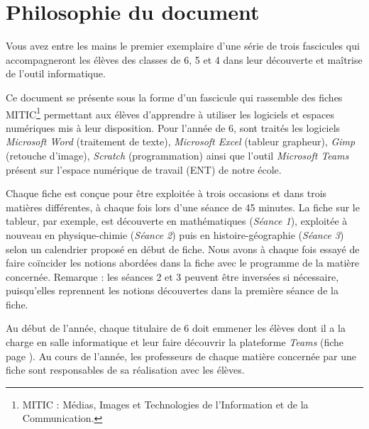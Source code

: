 \chapter*{Philosophie du document}



Vous avez entre les mains le premier exemplaire d'une série de trois fascicules qui accompagneront les élèves des classes de 6, 5 et 4 dans leur découverte et maîtrise de l'outil informatique.

\vspace{18pt}

Ce document se présente sous la forme d'un fascicule qui rassemble des fiches MITIC\footnote{MITIC : Médias, Images et Technologies de l'Information et de la Communication.} permettant aux élèves d'apprendre à utiliser les logiciels et espaces numériques mis à leur disposition. Pour l'année de 6, sont traités les logiciels \emph{Microsoft Word} (traitement de texte), \emph{Microsoft Excel} (tableur grapheur), \emph{Gimp} (retouche d'image), \emph{Scratch} (programmation) ainsi que l'outil \emph{Microsoft Teams} présent sur l'espace numérique de travail (ENT) de notre école. %

\vspace{18pt}


Chaque fiche est conçue pour être exploitée à trois occasions et dans trois matières différentes, à chaque fois lors d'une séance de 45 minutes. La fiche sur le tableur, par exemple, est découverte en mathématiques (\emph{Séance 1}), exploitée à nouveau en physique-chimie (\emph{Séance 2}) puis en histoire-géographie (\emph{Séance 3}) selon un calendrier proposé en début de fiche. Nous avons à chaque fois essayé de faire coïncider les notions abordées dans la fiche avec le programme de la matière concernée. Remarque : les séances 2 et 3 peuvent être inversées si nécessaire, puisqu'elles reprennent les notions découvertes dans la première séance de la fiche.

\vspace{18pt}

Au début de l'année, chaque titulaire de 6 doit emmener les élèves dont il a la charge en salle informatique et leur faire découvrir la plateforme \emph{Teams} (fiche page \pageref{teams1}). Au cours de l'année, les professeurs de chaque matière concernée par une fiche sont responsables de sa réalisation avec les élèves.

